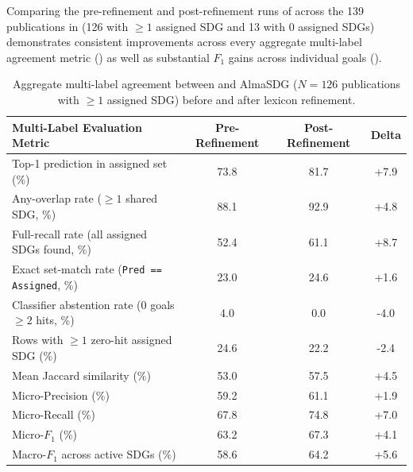 Comparing the pre-refinement and post-refinement runs of  across the \num{139} publications in  (\num{126} with $\ge 1$ assigned \gls{SDG} and \num{13} with \num{0} assigned \glspl{SDG}) demonstrates consistent improvements across every aggregate multi-label agreement metric () as well as substantial $F_1$ gains across individual goals ().

\begin{table}[!ht]
  \centering
  \caption{Aggregate multi-label agreement between  and AlmaSDG ($N = \num{126}$ publications with $\ge 1$ assigned \gls{SDG}) before and after lexicon refinement.}
  \label{tab:almasdg_summary_comparison}
  \begin{tabular}{
    l
    S[table-format=3.1]
    S[table-format=3.1]
    S[table-format=+2.1]
  }
    \toprule
    \textbf{Multi-Label Evaluation Metric} & {\textbf{Pre-Refinement}} & {\textbf{Post-Refinement}} & {\textbf{Delta}} \\
    \midrule
    Top-1 prediction in assigned set (\unit{\percent}) & 73.8 & 81.7 & +7.9 \\
    Any-overlap rate ($\ge 1$ shared \gls{SDG}, \unit{\percent}) & 88.1 & 92.9 & +4.8 \\
    Full-recall rate (all assigned \glspl{SDG} found, \unit{\percent}) & 52.4 & 61.1 & +8.7 \\
    Exact set-match rate (\texttt{Pred == Assigned}, \unit{\percent}) & 23.0 & 24.6 & +1.6 \\
    Classifier abstention rate ($0$ goals $\ge 2$ hits, \unit{\percent}) & 4.0 & 0.0 & -4.0 \\
    Rows with $\ge 1$ zero-hit assigned \gls{SDG} (\unit{\percent}) & 24.6 & 22.2 & -2.4 \\
    Mean Jaccard similarity (\unit{\percent}) & 53.0 & 57.5 & +4.5 \\
    Micro-Precision (\unit{\percent}) & 59.2 & 61.1 & +1.9 \\
    Micro-Recall (\unit{\percent}) & 67.8 & 74.8 & +7.0 \\
    Micro-$F_1$ (\unit{\percent}) & 63.2 & 67.3 & +4.1 \\
    Macro-$F_1$ across active \glspl{SDG} (\unit{\percent}) & 58.6 & 64.2 & +5.6 \\
    \bottomrule
  \end{tabular}
\end{table}

